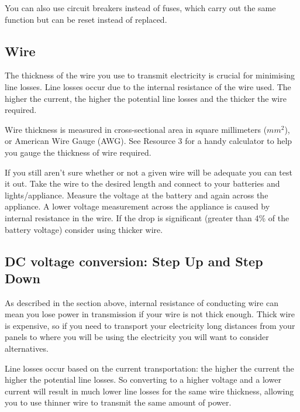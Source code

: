 \documentclass{article}
\theoremstyle{definition}
\theoremstyle{definition}
\theoremstyle{remark}
\begin{document}
      You can also use circuit breakers instead of fuses, which carry out the same function but can be reset instead of replaced.
    


  \subsection{Wire} %
  \label{sub:wire}

    The thickness of the wire you use to transmit electricity is crucial for minimising line losses. Line losses occur due to the internal resistance of the wire used. The higher the current, the higher the potential line losses and the thicker the wire required. 

    Wire thickness is measured in cross-sectional area in square millimeters ($mm^{2}$), or American Wire Gauge (AWG). See Resource 3 for a handy calculator to help you gauge the thickness of wire required. 

    If you still aren't sure whether or not a given wire will be adequate you can test it out. Take the wire to the desired length and connect to your batteries and lights/appliance. Measure the voltage at the battery and again across the appliance. A lower voltage measurement across the appliance is caused by internal resistance in the wire. If the drop is significant (greater than 4\% of the battery voltage) consider using thicker wire. 
  

  \subsection{DC voltage conversion: Step Up and Step Down} %
  \label{sub:dc_voltage_conversion_step_up_and_step_down}

    As described in the section above, internal resistance of conducting wire can mean you lose power in transmission if your wire is not thick enough. Thick wire is expensive, so if you need to transport your electricity long distances from your panels to where you will be using the electricity you will want to consider alternatives.

    Line losses occur based on the current transportation: the higher the current the higher the potential line losses. So converting to a higher voltage and a lower current will result in much lower line losses for the same wire thickness, allowing you to use thinner wire to transmit the same amount of power. 
\end{document}
